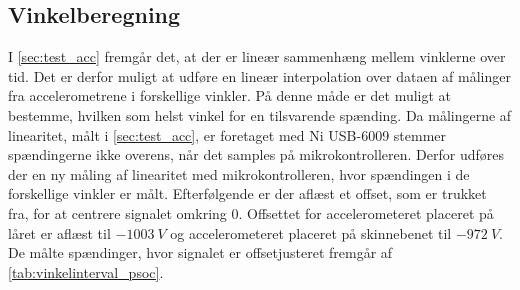 \subsection{Vinkelberegning}\label{sec:imp_vinkler}
I \autoref{sec:test_acc} fremgår det, at der er lineær sammenhæng mellem vinklerne over tid. Det er derfor muligt at udføre en lineær interpolation over dataen af målinger fra accelerometrene i forskellige vinkler. På denne måde er det muligt at bestemme, hvilken som helst vinkel for en tilsvarende spænding. Da målingerne af linearitet, målt i \autoref{sec:test_acc}, er foretaget med Ni USB-6009 stemmer spændingerne ikke overens, når det samples på mikrokontrolleren. Derfor udføres der en ny måling af linearitet med mikrokontrolleren, hvor spændingen i de forskellige vinkler er målt. Efterfølgende er der aflæst et offset, som er trukket fra, for at centrere signalet omkring 0. Offsettet for accelerometeret placeret på låret er aflæst til $-1003~V$ og accelerometeret placeret på skinnebenet til $-972~V$. De målte spændinger, hvor signalet er offsetjusteret fremgår af \autoref{tab:vinkelinterval_psoc}.

